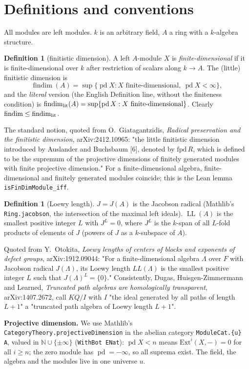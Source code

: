\documentclass[11pt]{article}
\theoremstyle{definition}
\newtheorem{definition}[theorem]{Definition}
\newcommand{\pd}{\operatorname{pd}}
\newcommand{\fd}{\operatorname{findim}}
\newcommand{\LL}{\operatorname{LL}}
\begin{document}
\section{Definitions and conventions}

All modules are left modules. $k$ is an arbitrary field, $A$ a ring with a $k$-algebra structure.

\begin{definition}[finitistic dimension]
A left $A$-module $X$ is \emph{finite-dimensional} if it is finite-dimensional over $k$ after
restriction of scalars along $k\to A$. The (little) finitistic dimension is
\[\fd(A)=\sup\{\pd X : X \text{ finite-dimensional}, \ \pd X<\infty\},\]
and the \emph{literal} version (the English Definition line, without the finiteness condition) is
$\fd_{\rm lit}(A)=\sup\{\pd X : X \text{ finite-dimensional}\}$. Clearly $\fd\le\fd_{\rm lit}$.
\end{definition}
The standard notion, quoted from O.~Giatagantzidis, \emph{Radical preservation and the finitistic
dimension}, arXiv:2412.10965: "the little finitistic dimension introduced by Auslander and Buchsbaum
[6], denoted by $\mathrm{fpd}\,R$, which is defined to be the supremum of the projective dimensions
of finitely generated modules with finite projective dimension." For a finite-dimensional algebra,
finite-dimensional and finitely generated modules coincide; this is the Lean lemma
\texttt{isFinDimModule\_iff}.

\begin{definition}[Loewy length]
$J=J(A)$ is the Jacobson radical (Mathlib's \texttt{Ring.jacobson}, the intersection of the maximal
left ideals). $\LL(A)$ is the smallest positive integer $L$ with $J^L=0$, where $J^L$ is the
$k$-span of all $L$-fold products of elements of $J$ (powers of $J$ as a $k$-subspace of $A$).
\end{definition}
Quoted from Y.~Otokita, \emph{Loewy lengths of centers of blocks and exponents of defect groups},
arXiv:1912.09044: "For a finite-dimensional algebra $\Lambda$ over $F$ with Jacobson radical
$J(\Lambda)$, its Loewy length $LL(\Lambda)$ is the smallest positive integer $L$ such that
$J(\Lambda)^{L}=\{0\}$." Consistently, Dugas, Huisgen-Zimmermann and Learned, \emph{Truncated path
algebras are homologically transparent}, arXiv:1407.2672, call $KQ/I$ with $I$ "the ideal generated
by all paths of length $L+1$" a "truncated path algebra of Loewy length $L+1$".

\textbf{Projective dimension.} We use Mathlib's \texttt{CategoryTheory.projectiveDimension} in the
abelian category \texttt{ModuleCat.\{u\} A}, valued in $\mathbb N\cup\{\pm\infty\}$
(\texttt{WithBot ENat}): $\pd X<n$ means $\mathrm{Ext}^i(X,-)=0$ for all $i\ge n$; the zero module has
$\pd=-\infty$, so all suprema exist. The field, the algebra and the modules live in one universe $u$.
\end{document}
